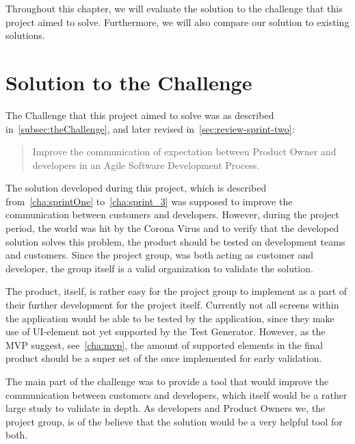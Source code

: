 Throughout this chapter, we will evaluate the solution to the challenge that this project aimed to solve.
Furthermore, we will also compare our solution to existing solutions.

\section{Solution to the Challenge}
The Challenge that this project aimed to solve was as described in~\autoref{subsec:theChallenge}, and later revised in~\autoref{sec:review-sprint-two}:

\begin{quote}
    Improve the communication of expectation between Product Owner and developers in an Agile Software Development Process.
\end{quote}

The solution developed during this project, which is described from~\autoref{cha:sprintOne} to~\autoref{cha:sprint_3} was supposed to improve the communication between customers and developers.
However, during the project period, the world was hit by the Corona Virus and to verify that the developed solution solves this problem, the product should be tested on development teams and customers.
Since the project group, was both acting as customer and developer, the group itself is a valid organization to validate the solution.

The product, itself, is rather easy for the project group to implement as a part of their further development for the project itself.
Currently not all screens within the application would be able to be tested by the application, since they make use of UI-element not yet supported by the Test Generator.
However, as the MVP suggest, see~\autoref{cha:mvp}, the amount of supported elements in the final product should be a super set of the once implemented for early validation.

The main part of the challenge was to provide a tool that would improve the communication between customers and developers, which itself would be a rather large study to validate in depth.
As developers and Product Owners we, the project group, is of the believe that the solution would be a very helpful tool for both.

